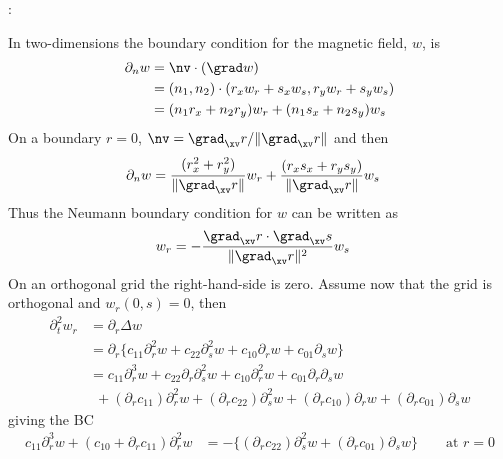 \documentclass[10pt]{article}
\begin{document}
:

In two-dimensions the boundary condition for the magnetic field, $w$, is
\begin{align*}
    \partial_n w & = \nv\cdot(\grad w) \\
                 & = (n_1,n_2)\cdot(r_x w_r + s_x w_s, r_y w_r + s_y w_s ) \\
                 & = (n_1 r_x + n_2 r_y ) w_r + (n_1 s_x + n_2 s_y ) w_s 
\end{align*}
On a boundary $r=0$, $\nv=\grad_\xv r/\| \grad_\xv r \|$ and then
\begin{align*}
  \partial_n w & = {(r_x^2 + r_y^2) \over \| \grad_\xv r \|} w_r + {(r_x s_x + r_y s_y )\over \| \grad_\xv r \|}  w_s 
\end{align*}
Thus the Neumann boundary condition for $w$ can be written as 
\begin{align*}
  w_r &= - {\grad_\xv r\cdot\grad_\xv s \over   \| \grad_\xv r \|^2 } w_s 
\end{align*}
On an orthogonal grid the right-hand-side is zero.
Assume now that the grid is orthogonal and $w_r(0,s)=0$, then 
\begin{align*}
  \partial_t^2 w_r &= \partial_r\Delta w \\
   &= \partial_r\big\{ c_{11} \partial_r^2 w+ c_{22}\partial_s^2 w+ c_{10} \partial_r w+ c_{01} \partial_s w\big\}\\
   &= c_{11} \partial_r^3 w+ c_{22}\partial_r\partial_s^2 w+ c_{10} \partial_r^2 w+ c_{01} \partial_r\partial_s w \\
   &~~+ (\partial_r c_{11}) \partial_r^2 w+ (\partial_r c_{22})\partial_s^2 w
      + (\partial_r c_{10}) \partial_r w+ (\partial_r c_{01}) \partial_s w
\end{align*}
giving the BC
\begin{align*}
c_{11} \partial_r^3 w + (c_{10}+\partial_r c_{11})\partial_r^2 w &=
   -\big\{ (\partial_r c_{22})\partial_s^2 w + (\partial_r c_{01}) \partial_s w \big\} \qquad\mbox{at $r=0$}
\end{align*}
\end{document}
